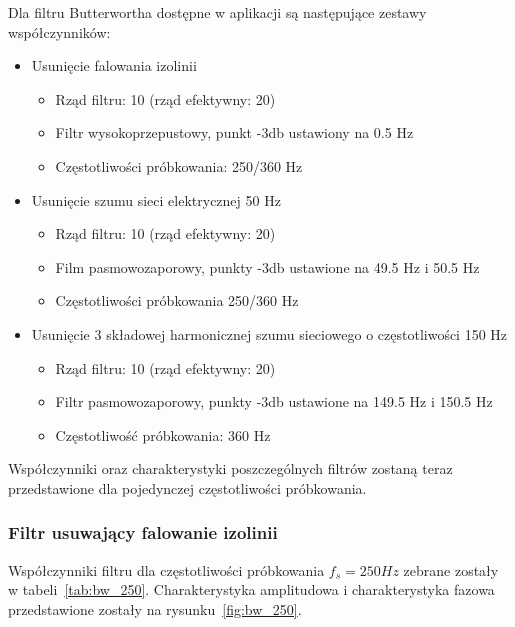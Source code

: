 Dla filtru Butterwortha dostępne w aplikacji są następujące zestawy współczynników:

\begin{itemize}

\item Usunięcie falowania izolinii
\begin{itemize}
\item Rząd filtru: 10 (rząd efektywny: 20)
\item Filtr wysokoprzepustowy, punkt -3db ustawiony na 0.5 Hz
\item Częstotliwości próbkowania: 250/360 Hz
\end{itemize}

\item Usunięcie szumu sieci elektrycznej 50 Hz
\begin{itemize}
\item Rząd filtru: 10 (rząd efektywny: 20)
\item Film pasmowozaporowy, punkty -3db ustawione na 49.5 Hz i 50.5 Hz
\item Częstotliwości próbkowania 250/360 Hz
\end{itemize}

\item Usunięcie 3 składowej harmonicznej szumu sieciowego o częstotliwości 150 Hz
\begin{itemize}
\item Rząd filtru: 10 (rząd efektywny: 20)
\item Filtr pasmowozaporowy, punkty -3db ustawione na 149.5 Hz i 150.5 Hz
\item Częstotliwość próbkowania: 360 Hz
\end{itemize}

\end{itemize}

Współczynniki oraz charakterystyki poszczególnych filtrów zostaną teraz przedstawione dla pojedynczej częstotliwości próbkowania.

\subsubsection{Filtr usuwający falowanie izolinii}

Współczynniki filtru dla częstotliwości próbkowania $f_s=250 Hz$ zebrane zostały w tabeli~\ref{tab:bw_250}. Charakterystyka amplitudowa i charakterystyka fazowa przedstawione zostały na rysunku~\ref{fig:bw_250}.

